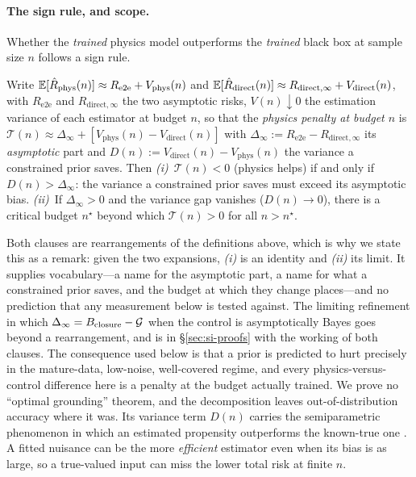 \paragraph{The sign rule, and scope.}\label{sec:tax} Whether the \emph{trained} physics model
outperforms the \emph{trained} black box at sample size $n$ follows a sign rule.

\begin{remark}\label{prop:tax}
Write $\mathbb{E}[\hat R_{\mathrm{phys}}(n)]\approx R_{\mathrm{e2e}}+V_{\mathrm{phys}}(n)$ and
$\mathbb{E}[\hat R_{\mathrm{direct}}(n)]\approx R_{\mathrm{direct},\infty}+V_{\mathrm{direct}}(n)$, with
$R_{\mathrm{e2e}}$ and $R_{\mathrm{direct},\infty}$ the two asymptotic risks, $V(n)\downarrow0$ the
estimation variance of each estimator at budget $n$, so that the \emph{physics penalty at budget
$n$} is
$\mathcal{T}(n)\approx\Delta_\infty+[V_{\mathrm{phys}}(n)-V_{\mathrm{direct}}(n)]$ with
$\Delta_\infty:=R_{\mathrm{e2e}}-R_{\mathrm{direct},\infty}$ its \emph{asymptotic} part and
$D(n):=V_{\mathrm{direct}}(n)-V_{\mathrm{phys}}(n)$ the variance a constrained prior saves. Then
\emph{(i)}~$\mathcal{T}(n)<0$ (physics helps) if and only if $D(n)>\Delta_\infty$: the variance a
constrained prior saves must exceed its asymptotic bias. \emph{(ii)}~If $\Delta_\infty>0$ and the
variance gap vanishes ($D(n)\to0$), there is a critical budget $n^\star$ beyond which
$\mathcal{T}(n)>0$ for all $n>n^\star$.
\end{remark}

\noindent Both clauses are rearrangements of the definitions above, which is why we state this as a
remark: given the two expansions, \emph{(i)} is an identity and \emph{(ii)} its limit. It supplies
vocabulary---a name for the asymptotic part, a name for what a constrained prior saves, and the
budget at which they change places---and no prediction that any measurement below is tested against.
The limiting refinement in which $\Delta_\infty=B_{\mathrm{closure}}-\mathcal{G}$ when the control is asymptotically
Bayes goes beyond a rearrangement, and is in \S\ref{sec:si-proofs} with the working of both clauses.
The consequence used below is that a prior is predicted to hurt precisely in the mature-data,
low-noise, well-covered regime, and every physics-versus-control difference here is a penalty at the
budget actually trained. We prove no ``optimal grounding'' theorem, and the decomposition leaves
out-of-distribution accuracy where it was. Its variance term $D(n)$ carries the semiparametric
phenomenon in which an estimated propensity outperforms the known-true one
\cite{hirano2003,robins1997}. A fitted nuisance can be the more \emph{efficient} estimator even when
its bias is as large, so a true-valued input can miss the lower total risk at finite $n$.

